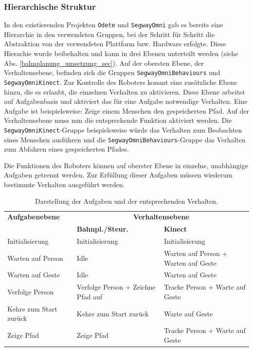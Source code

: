 \subsubsection{Hierarchische Struktur}
\label{integration_umsetzung_hierarchie_sec}

In den existierenden Projekten \lstinline{Odete} und \lstinline{SegwayOmni} gab es bereits eine Hierarchie 
in den verwendeten Gruppen, bei der Schritt für Schritt die Abstraktion von der verwendeten 
Plattform bzw. Hardware erfolgte. Diese Hierachie wurde beibehalten und kann in drei Ebenen unterteilt 
werden (siehe Abs. \ref{bahnplanung_umsetzung_sec}). Auf der obersten Ebene, der Verhaltensebene, befinden sich die 
Gruppen \lstinline{SegwayOmniBehaviours} und \lstinline{SegwayOmniKinect}. Zur Kontrolle des Roboters kommt 
eine zusätzliche Ebene hinzu, die es erlaubt, die einzelnen Verhalten zu aktivieren. Diese Ebene arbeitet auf 
Aufgabenbasis und aktiviert das für eine Aufgabe notwendige Verhalten.
Eine Aufgabe ist beispielsweise: Zeige einem Menschen den gespeicherten Pfad. Auf der Verhaltensebene muss nun die entsprechende 
Funktion aktiviert werden. Die
\lstinline{SegwayOmniKinect}-Gruppe beispielsweise würde das Verhalten zum Beobachten
eines Menschen ausführen und die \lstinline{SegwayOmniBehaviours}-Gruppe das
Verhalten zum Abfahren eines gespeicherten Pfades.

Die Funktionen des Roboters können auf oberster Ebene in einzelne, unabhängige Aufgaben getrennt werden. Zur Erfüllung dieser Aufgaben müssen wiederum bestimmte Verhalten ausgeführt werden.
\begin{table}[h]
	\label{tab:integration_aufgaben}
	\centering
	\begin{tabular}{|p{3.7cm}|p{3cm}|p{3.2cm}|}
	\hline
	\textbf{Aufgabenebene}	&	\multicolumn{2}{c|}{\textbf{Verhaltensebene}}\\
		&	\textbf{Bahnpl./Steur.}	&	\textbf{Kinect}	\\
	\hline
	Initialisierung	&	Initialisierung	&	Initialisierung \\
	\hline
	Warten auf Person	&	Idle	&	Warten auf Person + Warten auf Geste \\
	\hline
	Warten auf Geste	&	Idle	&	Warten auf Geste \\
	\hline
	Verfolge Person	&	Verfolge Person + Zeichne Pfad auf	&	Tracke Person + Warte auf Geste \\
	\hline
	Kehre zum Start zurück	&	Kehre zum Start zurück	&	Warte auf Geste \\
	\hline
	Zeige Pfad	& Zeige Pfad	&	Tracke Person + Warte auf Geste \\
	\hline
	\end{tabular}
	\caption{Darstellung der Aufgaben und der entsprechenden Verhalten.}
\end{table}

